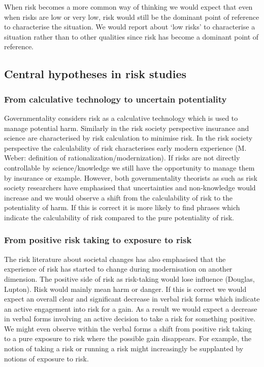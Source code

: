 When risk becomes a more common way of thinking we would expect that even when risks are low or very low, risk would still be the dominant point of reference to characterise the situation. We would report about `low risks' to characterise a situation rather than to other qualities since risk has become a dominant point of reference.


\subsection{Central hypotheses in risk studies}

\subsubsection*{From calculative technology to uncertain potentiality}

Governmentality considers risk as a calculative technology which is used to manage potential harm. Similarly in the risk society perspective insurance and science are characterised by risk calculation to minimise risk. In the risk society perspective the calculability of risk characterises early modern experience (M. Weber: definition of rationalization\slash modernization). If risks are not directly controllable by science\slash knowledge we still have the opportunity to manage them by insurance or example. However, both governmentality theorists as such as risk society researchers have emphasised that uncertainties and non-knowledge would increase and we would observe a shift from the calculability of risk to the potentiality of harm. If this is correct it is more likely to find phrases which indicate the calculability of risk compared to the pure potentiality of risk. 

\subsubsection*{From positive risk taking to exposure to risk}

The risk literature about societal changes has also emphasised that the experience of risk has started to change during modernisation on another dimension. The positive side of risk as risk-taking would lose influence (Douglas, Lupton). Risk would mainly mean harm or danger. If this is correct we would expect an overall clear and significant decrease in verbal risk forms which indicate an active engagement into risk for a gain. As a result we would expect a decrease in verbal forms involving an active decision to take a risk for something positive. We might even observe within the verbal forms a shift from positive risk taking to a pure exposure to risk where the possible gain disappears. For example, the notion of taking a risk or running a risk might increasingly be supplanted by notions of exposure to risk.


